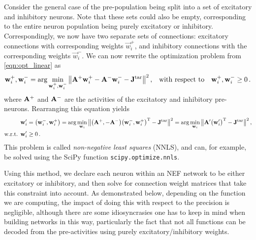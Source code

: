 \documentclass[10pt,letterpaper,oneside]{article}
\begin{document}
Consider the general case of the pre-population being split into a set of excitatory and inhibitory neurons. Note that these sets could also be empty, corresponding to the entire neuron population being purely excitatory or inhibitory. Correspondingly, we now have two separate sets of connections: excitatory connections with corresponding weights $\vec w_i^+$, and inhibitory connections with the corresponding weights $\vec w_i^-$. We can now rewrite the optimization problem from \cref{eqn:opt_linear} as
\begin{align}
	{\mathbf{w}}_i^+, {\mathbf{w}}_i^- &= \arg\min_{{\mathbf{w}}_i^+, {\mathbf{w}}_i^-} \big\| {\mathbf{A}}^+ {\mathbf{w}}^+_i - {\mathbf{A}}^- {\mathbf{w}}^-_i - {\mathbf{J}}^\mathrm{tar} \big\|^2 \,, & \text{with respect to} \quad {\mathbf{w}}_i^+, {\mathbf{w}}_i^- \geq 0 \,.
	\label{eqn:opt_dale}
\end{align}
where ${\mathbf{A}}^+$ and ${\mathbf{A}}^-$ are the activities of the excitatory and inhibitory pre-neurons. Rearranging this equation yields
\begin{align*}
	{\mathbf{w}}'_i &= \big({\mathbf{w}}^-_i, {\mathbf{w}}^+_i\big) 
		       = \arg\min_{{\mathbf{w}}_i} \big\| \big( {\mathbf{A}}^+, -{\mathbf{A}}^- \big) \big({\mathbf{w}}^-_i, {\mathbf{w}}^+_i \big)^{\mathrm{T}} - {\mathbf{J}}^\mathrm{tar} \big\|^2
		       = \arg\min_{{\mathbf{w}}_i} \big\| {\mathbf{A}}' \big({\mathbf{w}}'_i\big)^{\mathrm{T}} - {\mathbf{J}}^\mathrm{tar} \big\|^2 \,, \\
	\text{w.r.t. } {\mathbf{w}}'_i &\geq 0 \,.
\end{align*}
This problem is called \emph{non-negative least squares} (NNLS), and can, for example, be solved using the SciPy function \texttt{scipy.optimize.nnls}.

Using this method, we declare each neuron within an NEF network to be either excitatory or inhibitory, and then solve for connection weight matrices that take this constraint into account. As demonstrated below, depending on the function we are computing, the impact of doing this with respect to the precision is negligible, although there are some idiosyncrasies one has to keep in mind when building networks in this way, particularly the fact that not all functions can be decoded from the pre-activities using purely excitatory/inhibitory weights.

\end{document}
